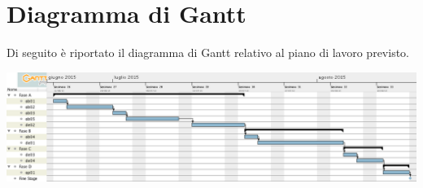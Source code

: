 \section*{Diagramma di Gantt}
Di seguito è riportato il diagramma di Gantt relativo al piano di lavoro previsto.
\begin{center}
	\includegraphics[width=18cm]{img/gantt.png}
\end{center}

\newpage
